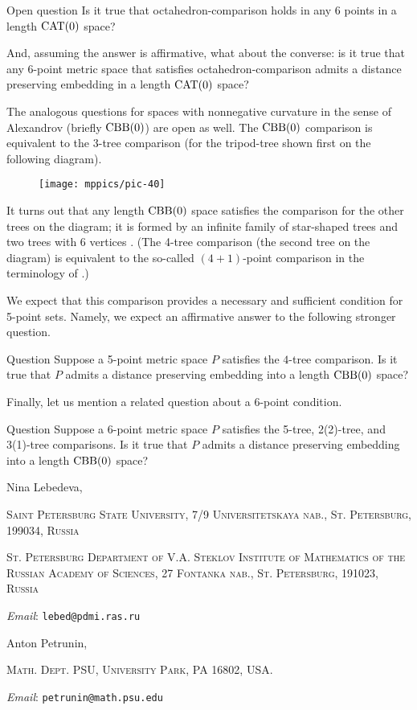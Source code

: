 \documentclass{article}
\makeatletter
\newcommand{\Addresses}{{\bigskip\footnotesize

\noindent Nina Lebedeva,
\par\nopagebreak
 \textsc{Saint Petersburg State University, 7/9 Universitetskaya nab., St. Petersburg, 199034, Russia}
\par
\nopagebreak
 \textsc{St. Petersburg Department of V.A. Steklov Institute of Mathematics of the Russian Academy of Sciences, 27 Fontanka nab., St. Petersburg, 191023, Russia}
  \par\nopagebreak
  \textit{Email}: \texttt{lebed@pdmi.ras.ru}

\medskip

\noindent   Anton Petrunin, 
\par\nopagebreak
 \textsc{Math. Dept. PSU, University Park, PA 16802, USA.}
  \par\nopagebreak
  \textit{Email}: \texttt{petrunin@math.psu.edu}
  
}}
\makeatother
\begin{document}
\begin{thm}{Open question}
Is it true that octahedron-comparison holds in any 6 points in a length $\mathrm{CAT}(0)$ space?

And, assuming the answer is affirmative, what about the converse: is it true that any 6-point metric space that satisfies octahedron-comparison admits a distance preserving embedding in a length $\mathrm{CAT}(0)$ space?
\end{thm}


The analogous questions for  spaces with nonnegative curvature in the sense of Alexandrov (briefly $\mathrm{CBB}(0)$) are open as well.
The $\mathrm{CBB}(0)$ comparison is equivalent to the $3$-tree comparison (for the tripod-tree shown first on the following diagram).
\begin{figure}[h!]
\vskip-0mm
\centering
\texttt{[image: mppics/pic-40]}
\end{figure}
It turns out that any length $\mathrm{CBB}(0)$ space satisfies the comparison for the other trees on the diagram; it is formed by an infinite family of star-shaped trees and two trees with 6 vertices \cite{alexander-kapovitch-petrunin-2011,lebedeva-petrunin-zolotov}.
(The 4-tree comparison (the second tree on the diagram) is equivalent to the so-called $(4{+}1)$-point comparison in the terminology of \cite{alexander-kapovitch-petrunin-2011}.)

We expect that this comparison provides a necessary and sufficient condition for 5-point sets.
Namely, we expect an affirmative answer to the following stronger question.


\begin{thm}{Question}
Suppose a 5-point metric space $P$ satisfies the $4$-tree comparison.
Is it true that $P$ admits a distance preserving embedding into a length $\mathrm{CBB}(0)$ space?
\end{thm}

Finally, let us mention a related question about a 6-point condition. 

\begin{thm}{Question}
Suppose a 6-point metric space $P$ satisfies the 5-tree, 2(2)-tree, and 3(1)-tree comparisons.
Is it true that $P$ admits a distance preserving embedding into a length $\mathrm{CBB}(0)$ space?
\end{thm}


{\sloppy
\printbibliography[heading=bibintoc]
\fussy
}

\Addresses
\end{document}
